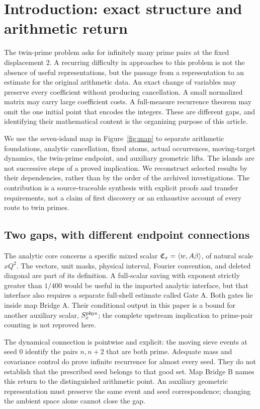 \section{Introduction: exact structure and arithmetic return}
The twin-prime problem asks for infinitely many prime pairs at the fixed displacement $2$. A recurring difficulty in approaches to this problem is not the absence of useful representations, but the passage from a representation to an estimate for the original arithmetic data. An exact change of variables may preserve every coefficient without producing cancellation. A small normalized matrix may carry large coefficient costs. A full-measure recurrence theorem may omit the one initial point that encodes the integers. These are different gaps, and identifying their mathematical content is the organizing purpose of this article.

We use the seven-island map in Figure~\ref{fig:map} to separate arithmetic foundations, analytic cancellation, fixed atoms, actual occurrences, moving-target dynamics, the twin-prime endpoint, and auxiliary geometric lifts. The islands are not successive steps of a proved implication. We reconstruct selected results by their dependencies, rather than by the order of the archived investigations. The contribution is a source-traceable synthesis with explicit proofs and transfer requirements, not a claim of first discovery or an exhaustive account of every route to twin primes.

\subsection{Two gaps, with different endpoint connections}
The analytic core concerns a specific mixed scalar $\mathfrak C_x=\langle w,A\beta\rangle$, of natural scale $xQ^2$. The vectors, unit masks, physical interval, Fourier convention, and deleted diagonal are part of its definition. A full-scalar saving with exponent strictly greater than $1/400$ would be useful in the imported analytic interface, but that interface also requires a separate full-shell estimate called Gate A. Both gates lie inside map Bridge A. Their conditional output in this paper is a bound for another auxiliary scalar, $S_x^{\rm phys}$; the complete upstream implication to prime-pair counting is not reproved here.

The dynamical connection is pointwise and explicit: the moving sieve events at seed $0$ identify the pairs $n,n+2$ that are both prime. Adequate mass and covariance control do prove infinite recurrence for almost every seed. They do not establish that the prescribed seed belongs to that good set. Map Bridge B names this return to the distinguished arithmetic point. An auxiliary geometric representation must preserve the same event and seed correspondence; changing the ambient space alone cannot close the gap.

